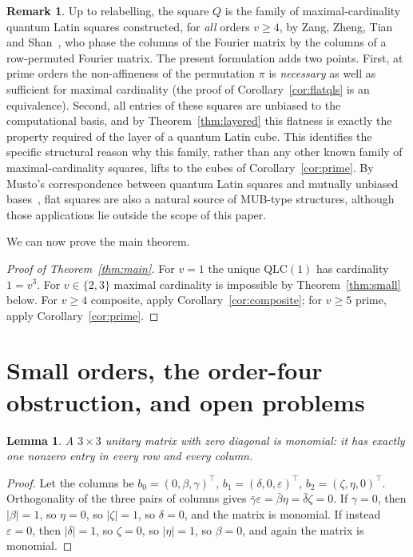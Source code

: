 \documentclass[11pt]{amsart}
\newtheorem{lemma}[theorem]{Lemma}
\theoremstyle{definition}
\newtheorem{remark}[theorem]{Remark}
\newcommand{\QLC}{\mathrm{QLC}}
\begin{document}
\begin{remark}\label{rem:zzts}
Up to relabelling, the square $Q$ is the family of maximal-cardinality
quantum Latin squares constructed, for \emph{all} orders $v\ge4$, by Zang,
Zheng, Tian and Shan~\cite[Thm.~3.1]{ZZTS2025}, who phase the columns of
the Fourier matrix by the columns of a row-permuted Fourier matrix.  The
present formulation adds two points.  First, at prime orders the
non-affineness of the permutation $\pi$ is \emph{necessary} as well as
sufficient for maximal cardinality (the proof of
Corollary~\ref{cor:flatqls} is an equivalence).  Second, all entries of
these squares are unbiased to the computational basis, and by
Theorem~\ref{thm:layered} this flatness is exactly the property required
of the layer of a quantum Latin cube.  This identifies the specific
structural reason why this family, rather than any other known family of
maximal-cardinality squares, lifts to the cubes of
Corollary~\ref{cor:prime}.  By Musto's correspondence between quantum Latin
squares and mutually unbiased bases~\cite{Musto2017}, flat squares are also
a natural source of MUB-type structures, although those applications lie
outside the scope of this paper.
\end{remark}

We can now prove the main theorem.

\begin{proof}[Proof of Theorem~\textup{\ref{thm:main}}]
For $v=1$ the unique $\QLC(1)$ has cardinality $1=v^3$.  For $v\in\{2,3\}$
maximal cardinality is impossible by Theorem~\ref{thm:small} below.
For $v\ge4$ composite, apply Corollary~\ref{cor:composite}; for $v\ge5$
prime, apply Corollary~\ref{cor:prime}.
\end{proof}

\section{Small orders, the order-four obstruction, and open problems}
\label{sec:remarks}

\begin{lemma}\label{lem:monomial}
A $3\times3$ unitary matrix with zero diagonal is monomial: it has exactly
one nonzero entry in every row and every column.
\end{lemma}

\begin{proof}
Let the columns be $b_0=(0,\beta,\gamma)^{\top}$,
$b_1=(\delta,0,\varepsilon)^{\top}$, $b_2=(\zeta,\eta,0)^{\top}$.
Orthogonality of the three pairs of columns gives
$\bar\gamma\varepsilon=\bar\beta\eta=\bar\delta\zeta=0$.  If $\gamma=0$,
then $|\beta|=1$, so $\eta=0$, so $|\zeta|=1$, so $\delta=0$, and the
matrix is monomial.  If instead $\varepsilon=0$, then $|\delta|=1$, so
$\zeta=0$, so $|\eta|=1$, so $\beta=0$, and again the matrix is monomial.
\end{proof}
\end{document}
